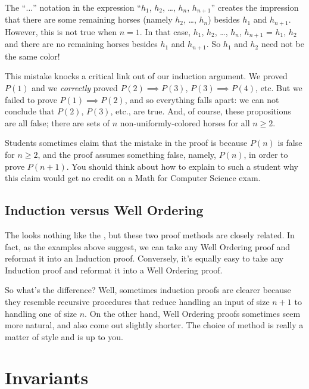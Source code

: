 The ``$\dots$'' notation in the expression ``$h_1$, $h_2$, \dots,
$h_n$, $h_{n+1}$'' creates the impression that there are some
remaining horses (namely $h_2$, \dots, $h_n$) besides $h_1$ and
$h_{n+1}$.  However, this is not true when $n = 1$.  In that case,
$h_1$, $h_2$, \dots, $h_n$, $h_{n+1}$ = $h_1$, $h_2$ and there are no
remaining horses besides $h_1$ and $h_{n+1}$.  So $h_1$ and $h_2$ need
not be the same color!

This mistake knocks a critical link out of our induction argument.  We
proved $P(1)$ and we \emph{correctly} proved $P(2) \implies P(3)$, $P(3)
\implies P(4)$, etc.  But we failed to prove $P(1) \implies P(2)$, and so
everything falls apart: we can not conclude that $P(2)$, $P(3)$, etc., are
true.  And, of course, these propositions are all false; there are
sets of $n$ non-uniformly-colored horses for all $n \ge 2$.

Students sometimes claim that the mistake in the proof is because
$P(n)$ is false for $n \geq 2$, and the proof assumes something false,
namely, $P(n)$, in order to prove $P(n+1)$.  You should think about
how to explain to such a student why this claim would get no credit on
a Math for Computer Science exam.

\subsection{Induction versus Well Ordering}\label{versusWO}

The  looks nothing like the , but these two proof methods are closely related.  In fact,
as the examples above suggest, we can take any Well Ordering proof and
reformat it into an Induction proof.  Conversely, it's equally easy to
take any Induction proof and reformat it into a Well Ordering proof.

So what's the difference?  Well, sometimes induction proofs are clearer
because they resemble recursive procedures that reduce handling an input
of size $n+1$ to handling one of size $n$.  On the other hand, Well
Ordering proofs sometimes seem more natural, and also come out slightly
shorter.  The choice of method is really a matter of style and is up
to you.



\section{Invariants}

